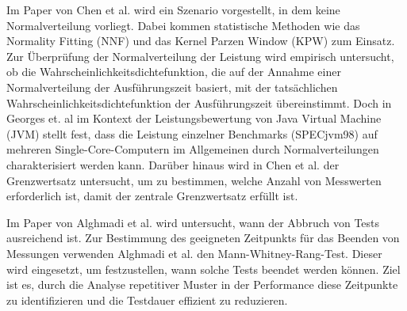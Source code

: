 Im Paper von Chen et al. \cite{statistical_performance_pc} wird ein Szenario vorgestellt, in dem keine Normalverteilung vorliegt.
Dabei kommen statistische Methoden wie das Normality Fitting (NNF) und das Kernel Parzen Window (KPW) zum Einsatz.
Zur Überprüfung der Normalverteilung der Leistung wird empirisch untersucht, 
ob die Wahrscheinlichkeitsdichtefunktion, die auf der Annahme einer Normalverteilung der Ausführungszeit basiert, 
mit der tatsächlichen Wahrscheinlichkeitsdichtefunktion der Ausführungszeit übereinstimmt.
Doch in Georges et. al \cite{statistically_rigorous} im Kontext der Leistungsbewertung von Java Virtual Machine (JVM) stellt fest, dass die Leistung einzelner Benchmarks (SPECjvm98) 
auf mehreren Single-Core-Computern im Allgemeinen durch Normalverteilungen charakterisiert werden kann.
Darüber hinaus wird in Chen et al. \cite{statistical_performance_pc} der Grenzwertsatz untersucht, 
um zu bestimmen, welche Anzahl von Messwerten erforderlich ist, damit der zentrale Grenzwertsatz erfüllt ist.

Im Paper von Alghmadi et al. \cite{when_stop_tests} wird untersucht, wann der Abbruch von Tests ausreichend ist. 
Zur Bestimmung des geeigneten Zeitpunkts für das Beenden von Messungen verwenden Alghmadi et al. 
\cite{when_stop_tests} den Mann-Whitney-Rang-Test. Dieser wird eingesetzt, um festzustellen, wann solche Tests beendet werden können. 
Ziel ist es, durch die Analyse repetitiver Muster in der Performance diese Zeitpunkte zu identifizieren und die Testdauer effizient zu reduzieren.




